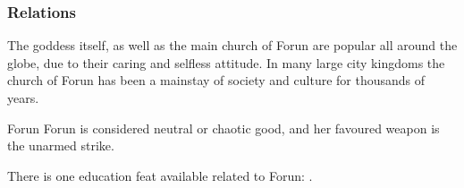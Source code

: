 \subsubsection*{Relations}

The goddess itself, as well as the main church of Forun are popular all around
the globe, due to their caring and selfless attitude. In many large city
kingdoms the church of Forun has been a mainstay of society and culture for
thousands of years.

\begin{35e}{Forun}
  Forun is considered neutral or chaotic good, and her favoured weapon is the
  unarmed strike.

  There is one education feat available related to Forun:
  .
\end{35e}
